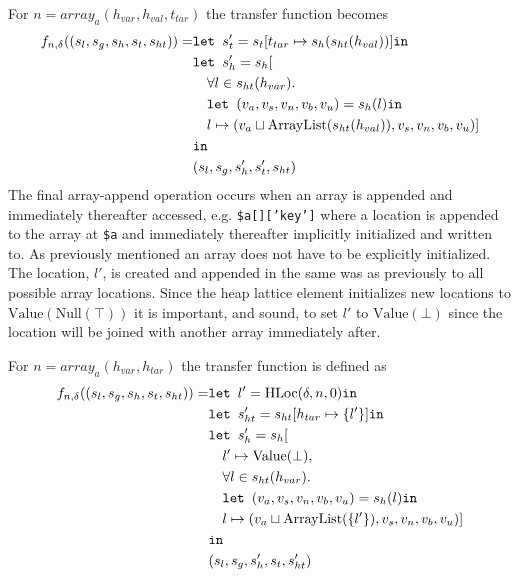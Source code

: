 For $n = \mathit{array}_a(h_{var}, h_{val},t_{tar})$ the transfer function becomes
\begin{align}
    f_{n,\delta}((s_l, s_g, s_h, s_t, s_{ht})) = &\texttt{let } s_t' = s_t[t_{tar}\mapsto s_h(s_{ht}(h_{val}))] \texttt{in }\notag\\
                              &\texttt{let } s_h' = s_h[\notag\\
                              &\quad \forall l \in s_{ht}(h_{var}).\notag\\
                              &\quad\texttt{let } (v_a,v_s,v_n,v_b,v_u) = s_h(l) \texttt{in } \notag\\
                              &\quad l\mapsto (v_a \sqcup \text{ArrayList}(s_{ht}(h_{val})), v_s, v_n, v_b, v_u)]\notag\\
                              & \texttt{in }\notag\\
                              &(s_l, s_g, s_h', s_t', s_{ht})
\end{align}
The final array-append operation occurs when an array is appended and immediately thereafter accessed, e.g. \texttt{\$a[]['key']} where a location is appended to the array at \texttt{\$a} and immediately  thereafter implicitly initialized and written to. As previously mentioned an array does not have to be explicitly initialized. The location, $l'$, is created and appended in the same was as previously to all possible array locations. Since the heap lattice element initializes new locations to $\text{Value}(\text{Null}(\top))$ it is important, and sound, to set $l'$ to $\text{Value}(\bot)$ since the location will be joined with another array immediately after. 

For $n = \mathit{array}_a(h_{var}, h_{tar})$ the transfer function is defined as
\begin{align}
    f_{n,\delta}((s_l, s_g, s_h, s_t, s_{ht})) = &\texttt{let } l' = \text{HLoc}(\delta, n, 0) \texttt{in }\notag\\
                              &\texttt{let } s_{ht}' = s_{ht}[h_{tar} \mapsto \{l'\}] \texttt{in }\notag\\
                              &\texttt{let } s_h' = s_h[\notag\\
                              &\quad l' \mapsto \text{Value}(\bot), \notag\\
                              &\quad \forall l \in s_{ht}(h_{var}).\notag\\
                              &\quad\texttt{let } (v_a,v_s,v_n,v_b,v_u) = s_h(l) \texttt{in } \notag\\
                              &\quad l\mapsto (v_a \sqcup \text{ArrayList}(\{l'\}), v_s, v_n, v_b, v_u)]\notag\\
                              & \texttt{in }\notag\\
                              &(s_l, s_g, s_h', s_t, s_{ht}')
\end{align}
\begin{comment}
\begin{program}
\centering
\begin{lstlisting}
$a = [];
$a[]["foo"] = 42;
\end{lstlisting}
\caption{Array append before write}
\label{lst:appendbefw}
\end{program}
\end{comment}
